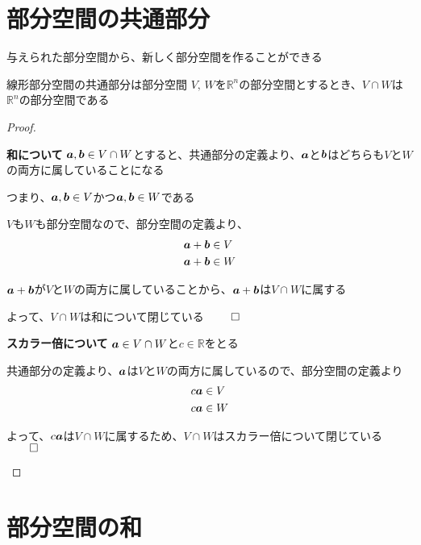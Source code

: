 \documentclass[../../../topic_linear-algebra]{subfiles}
\begin{document}
\sectionline
\section{部分空間の共通部分}

与えられた部分空間から、新しく部分空間を作ることができる

\begin{theorem}{線形部分空間の共通部分は部分空間}
  $V,\,W$を$\mathbb{R}^n$の部分空間とするとき、$V \cap W$は$\mathbb{R}^n$の部分空間である
\end{theorem}

\begin{proof}
  \begin{subpattern}{\bfseries 和について}
    $\vb*{a}, \vb*{b} \in V \cap W$とすると、共通部分の定義より、$\vb*{a}$と$\vb*{b}$はどちらも$V$と$W$の両方に属していることになる

    つまり、$\vb*{a}, \vb*{b} \in V$かつ$\vb*{a}, \vb*{b} \in W$である

    \br

    $V$も$W$も部分空間なので、部分空間の定義より、
    \begin{align*}
      \vb*{a} + \vb*{b} & \in V \\
      \vb*{a} + \vb*{b} & \in W
    \end{align*}

    $\vb*{a} + \vb*{b}$が$V$と$W$の両方に属していることから、$\vb*{a} + \vb*{b}$は$V \cap W$に属する

    よって、$V \cap W$は和について閉じている $\qed$
  \end{subpattern}

  \begin{subpattern}{\bfseries スカラー倍について}
    $\vb*{a} \in V \cap W$と$c \in \mathbb{R}$をとる

    共通部分の定義より、$\vb*{a}$は$V$と$W$の両方に属しているので、部分空間の定義より
    \begin{align*}
      c \vb*{a} & \in V \\
      c \vb*{a} & \in W
    \end{align*}

    よって、$c \vb*{a}$は$V \cap W$に属するため、$V \cap W$はスカラー倍について閉じている $\qed$
  \end{subpattern}
\end{proof}

\sectionline
\section{部分空間の和}
\end{document}
